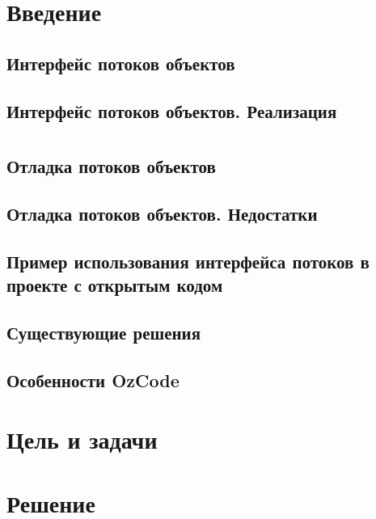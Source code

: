 

\section{Введение}

\subsection{Интерфейс потоков объектов}

\subsection{Интерфейс потоков объектов. Реализация}



\section{}
\subsection{Отладка потоков объектов}

\subsection{Отладка потоков объектов. Недостатки}

\subsection{Пример использования интерфейса потоков в проекте с открытым кодом}

\subsection{Существующие решения}

\subsection{Особенности OzCode}

\section{Цель и задачи}

\section{Решение}
